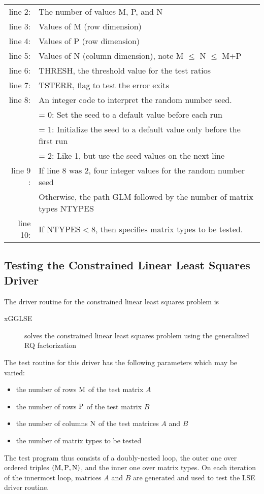 \begin{tabular}{r l}
\\
line 2: &  The number of values M, P, and N \\
line 3: &  Values of M (row dimension) \\
line 4: &  Values of P (row dimension) \\
line 5: &  Values of N (column dimension), note M $\leq$ N $\leq$ M+P \\
line 6: &  THRESH, the threshold value for the test ratios \\
line 7: &  TSTERR, flag to test the error exits \\
line 8: &  An integer code to interpret the random number seed. \\
        &  = 0:  Set the seed to a default value before each run \\
        &  = 1:  Initialize the seed to a default value only before the first run \\
        &  = 2:  Like 1, but use the seed values on the next line \\
line 9 :&  If line 8 was 2, four integer values for the random number seed \\
        &  Otherwise, the path GLM followed by the number of matrix types NTYPES \\
line 10: &  If $\mbox{NTYPES} < 8$, then specifies matrix types to be tested.
\end{tabular}

\subsection{Testing the Constrained Linear Least Squares Driver}
\dent
The driver routine for the constrained linear least squares problem is
\begin{description}
\item[xGGLSE] solves the constrained linear least squares problem using
the generalized RQ factorization 
\end{description}

The test routine for this driver has the following parameters which
may be varied:
\begin{itemize}
\item   the number of rows ${\rm M}$ of the test matrix $A$
\item   the number of rows ${\rm P}$ of the test matrix $B$
\item   the number of columns ${\rm N}$ of the test matrices $A$ and $B$
\item   the number of matrix types to be tested
\end{itemize}
The test program thus consists of a doubly-nested
loop, the outer one over ordered triples $({\rm M},{\rm P}, {\rm N})$,
and the inner one over matrix types.
On each iteration of the innermost loop,
matrices $A$ and $B$ are generated and used
to test the LSE driver routine.

